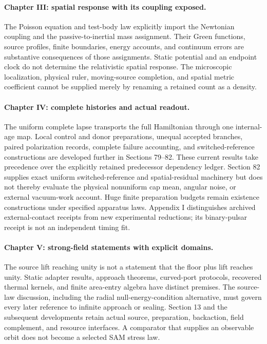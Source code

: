 \paragraph{Chapter III: spatial response with its coupling exposed.}
The Poisson equation and test-body law explicitly import the Newtonian coupling and the passive-to-inertial mass assignment. Their Green functions, source profiles, finite boundaries, energy accounts, and continuum errors are substantive consequences of those assignments. Static potential and an endpoint clock do not determine the relativistic spatial response. The microscopic localization, physical ruler, moving-source completion, and spatial metric coefficient cannot be supplied merely by renaming a retained count as a density.

\paragraph{Chapter IV: complete histories and actual readout.}
The uniform complete lapse transports the full Hamiltonian through one internal-age map. Local control and donor preparations, unequal accepted branches, paired polarization records, complete failure accounting, and switched-reference constructions are developed further in Sections 79--82. These current results take precedence over the explicitly retained predecessor dependency ledger. Section 82 supplies exact uniform switched-reference and spatial-residual machinery but does not thereby evaluate the physical nonuniform cap mean, angular noise, or external vacuum-work account. Huge finite preparation budgets remain existence constructions under specified apparatus laws. Appendix I distinguishes archived external-contact receipts from new experimental reductions; its binary-pulsar receipt is not an independent timing fit.

\paragraph{Chapter V: strong-field statements with explicit domains.}
The source lift reaching unity is not a statement that the floor plus lift reaches unity. Static adapter results, approach theorems, curved-port protocols, recovered thermal kernels, and finite area-entry algebra have distinct premises. The source-law discussion, including the radial null-energy-condition alternative, must govern every later reference to infinite approach or sealing. Section 13 and the subsequent developments retain actual source, preparation, backaction, field complement, and resource interfaces. A comparator that supplies an observable orbit does not become a selected SAM stress law.

